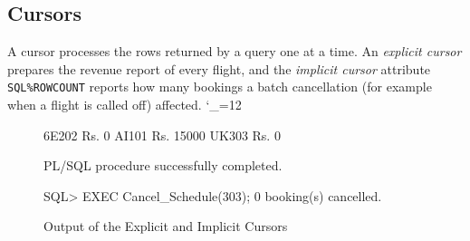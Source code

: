 \documentclass[12pt,a4paper]{article}
\newcommand{\sqlfile}{\begingroup\catcode`\_=12 \sqlfileA}
\newcommand{\sqlfileA}[1]{\endgroup}
\begin{document}
\subsection{Cursors}
A cursor processes the rows returned by a query one at a time. An \emph{explicit cursor} prepares the
revenue report of every flight, and the \emph{implicit cursor} attribute \texttt{SQL\%ROWCOUNT} reports how
many bookings a batch cancellation (for example when a flight is called off) affected.
\sqlfile{06_cursors.sql}
\begin{figure}[H]
\begin{terminal}
6E202     Rs. 0
AI101     Rs. 15000
UK303     Rs. 0

PL/SQL procedure successfully completed.

SQL> EXEC Cancel_Schedule(303);
0 booking(s) cancelled.
\end{terminal}
\caption{Output of the Explicit and Implicit Cursors}
\end{figure}
\end{document}
